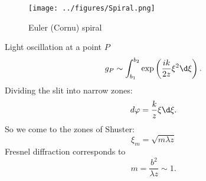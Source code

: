 \hspace{-5mm}
\begin{minipage}[t]{0.4\textwidth}
\begin{figure}[h]
    \centering
    \texttt{[image: ../figures/Spiral.png]}
    \caption{\small Euler (Cornu) spiral }
\end{figure}

\end{minipage}
\hfill
\begin{minipage}[t]{0.55\textwidth}
    Light oscillation at a point $P$
    \begin{equation*}
        g_P \sim \int_{b_1}^{b_2} \exp\left(
            \frac{ik}{2z}\xi^2 \d \xi
        \right).
    \end{equation*}
    Dividing the slit into narrow zones:
    \begin{equation*}
        d \varphi = \frac{k}{z}\xi \d \xi.
    \end{equation*}
    So we come to the zones of Shuster:
    \begin{equation*}
        \xi_m = \sqrt{m \lambda z}
    \end{equation*}
    Fresnel diffraction corresponds to
    \begin{equation*}
        m = \frac{b^2}{\lambda z} \sim 1.
    \end{equation*}
\end{minipage}

